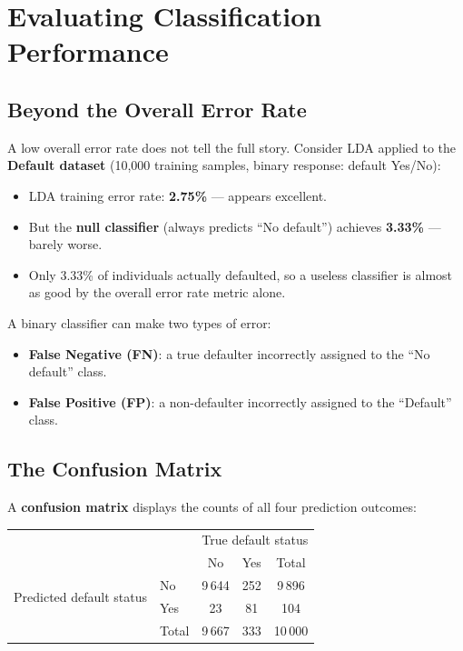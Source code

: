 \documentclass[11pt,a4paper]{article}
\theoremstyle{definition}
\theoremstyle{plain}
\theoremstyle{remark}
\begin{document}
\section{Evaluating Classification Performance}

\subsection{Beyond the Overall Error Rate}

A low overall error rate does not tell the full story. Consider LDA applied to the \textbf{Default dataset} (10,000 training samples, binary response: default Yes/No):
\begin{itemize}
    \item LDA training error rate: \textbf{2.75\%} — appears excellent.
    \item But the \textbf{null classifier} (always predicts ``No default'') achieves \textbf{3.33\%} — barely worse.
    \item Only 3.33\% of individuals actually defaulted, so a useless classifier is almost as good by the overall error rate metric alone.
\end{itemize}

A binary classifier can make two types of error:
\begin{itemize}
    \item \textbf{False Negative (FN)}: a true defaulter incorrectly assigned to the ``No default'' class.
    \item \textbf{False Positive (FP)}: a non-defaulter incorrectly assigned to the ``Default'' class.
\end{itemize}

\subsection{The Confusion Matrix}

A \textbf{confusion matrix} displays the counts of all four prediction outcomes:

\begin{center}
\begin{tabular}{llccc}
\hline
 & & \multicolumn{3}{c}{True default status} \\
 & & No & Yes & Total \\
\hline
\multirow{2}{*}{Predicted default status} & No  & 9\,644 & 252 & 9\,896 \\
                                           & Yes & 23     & 81  & 104    \\
\hline
 & Total & 9\,667 & 333 & 10\,000 \\
\hline
\end{tabular}
\end{center}
\end{document}
